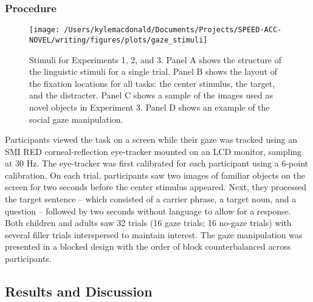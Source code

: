 \documentclass[oneside]{report}
\begin{document}
\subsubsection{Procedure}\label{procedure-1}
\begin{figure}[!t]

{\centering \texttt{[image: /Users/kylemacdonald/Documents/Projects/SPEED-ACC-NOVEL/writing/figures/plots/gaze\_stimuli]} 

}

\caption[Stimuli for Experiments 5.1, 5.2, and 5.3]{Stimuli for Experiments 1, 2, and 3. Panel A shows the structure of the linguistic stimuli for a single trial. Panel B shows the layout of the fixation locations for all tasks: the center stimulus, the target, and the distracter. Panel C shows a sample of the images used as novel objects in Experiment 3. Panel D shows an example of the social gaze manipulation.}\label{fig:gaze-stimuli}
\end{figure}
Participants viewed the task on a screen while their gaze was tracked
using an SMI RED corneal-reflection eye-tracker mounted on an LCD
monitor, sampling at 30 Hz. The eye-tracker was first calibrated for
each participant using a 6-point calibration. On each trial,
participants saw two images of familiar objects on the screen for two
seconds before the center stimulus appeared. Next, they processed the
target sentence -- which consisted of a carrier phrase, a target noun,
and a question -- followed by two seconds without language to allow for
a response. Both children and adults saw 32 trials (16 gaze trials; 16
no-gaze trials) with several filler trials interspersed to maintain
interest. The gaze manipulation was presented in a blocked design with
the order of block counterbalanced across participants.

\subsection{Results and Discussion}\label{results-and-discussion-5}
\end{document}
